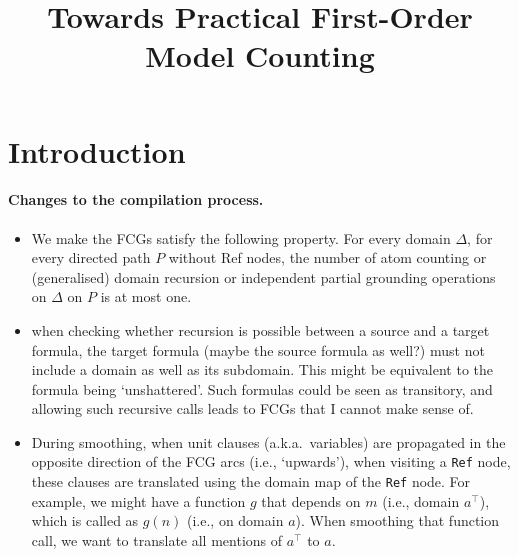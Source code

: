 \documentclass{article}
\title{Towards Practical First-Order Model Counting}
\begin{document}
\maketitle

\begin{abstract}
\end{abstract}

\section{Introduction}




\paragraph{Changes to the compilation process.}
\begin{itemize}
  \item We make the FCGs satisfy the following property. For every domain
        $\Delta$, for every directed path $P$ without Ref nodes, the number of
        atom counting or (generalised) domain recursion or independent partial
        grounding operations on $\Delta$ on $P$ is at most one.
  \item when checking whether recursion is possible between a source and a
        target formula, the target formula (maybe the source formula as well?)
        must not include a domain as well as its subdomain. This might be
        equivalent to the formula being `unshattered'. Such formulas could be
        seen as transitory, and allowing such recursive calls leads to FCGs that
        I cannot make sense of.
  \item During smoothing, when unit clauses (a.k.a.\ variables) are propagated
        in the opposite direction of the FCG arcs (i.e., `upwards'), when
        visiting a \texttt{Ref} node, these clauses are translated using the
        domain map of the \texttt{Ref} node. For example, we might have a
        function $g$ that depends on $m$ (i.e., domain $a^{\top}$), which is
        called as $g(n)$ (i.e., on domain $a$). When smoothing that function
        call, we want to translate all mentions of $a^{\top}$ to $a$.
\end{itemize}
\end{document}
